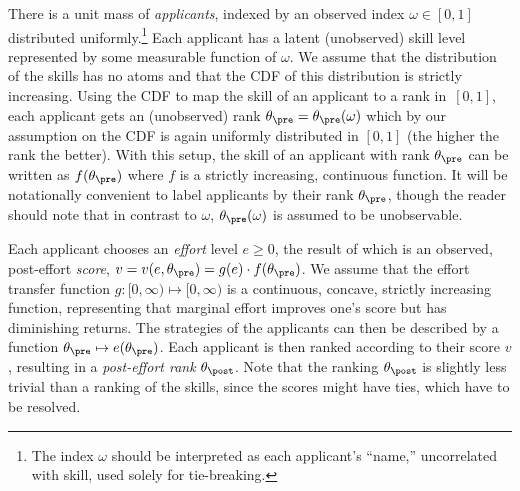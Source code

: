 \documentclass[10pt]{article}
\begin{document}
\begin{ReviewVerbatim}

There is a unit mass of \textit{applicants}, indexed by an observed index $\omega \in [0,1]$ distributed uniformly.\footnote{The index $\omega$ should be interpreted as each applicant's ``name,'' uncorrelated with skill, used solely for tie-breaking.}  Each applicant has a latent (unobserved) skill level represented by some measurable function of $\omega$.
We assume that {the distribution of the skills} has no atoms and that the CDF of this distribution is strictly increasing.
Using the CDF to map the skill of an applicant to a rank in~$[0,1]$, each applicant gets an (unobserved) rank $\theta_\pre =\theta_\pre(\omega)$ which by our assumption on the CDF is again uniformly distributed in $[0, 1]$ (the higher the rank the better).  With this setup, the skill of an applicant with rank $\theta_\pre$ can be written as $f(\theta_\pre)$ where $f$ is a strictly increasing, continuous function.  {It will be notationally convenient to label applicants by their rank $\theta_\pre$, though the reader should note that in contrast to $\omega$, $\theta_\pre(\omega)$ is assumed to be unobservable.}



Each applicant chooses an \textit{effort} level $e \ge 0$, the result of which is an observed, post-effort \textit{score}, {$v=v(e,\theta_\pre) = {g(e)}\cdot{f(\theta_\pre)}$}. 
{We assume} that the effort transfer function $g: [0, \infty) \mapsto [0, \infty)$ is a continuous, concave, strictly increasing function, representing that marginal effort improves one's score but has diminishing returns.
{%
{T}he strategies of the applicants can {then} be described by a function $\theta_\pre \mapsto e(\theta_\pre)$.
}
  Each {applicant} is then ranked according to their score $v$%
, resulting in a \textit{post-effort rank} $\theta_\post$.
Note that the ranking $\theta_\post$ is slightly less trivial than a ranking of the skills, since the scores might have ties, which have to be resolved.


\end{ReviewVerbatim}
\end{document}
